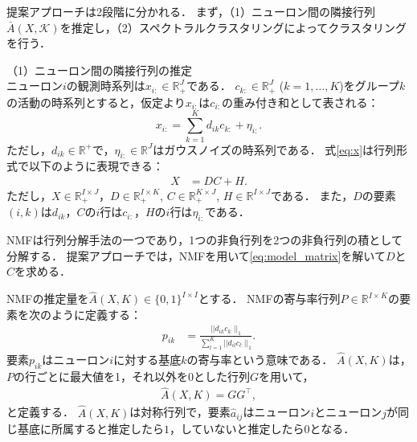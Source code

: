 \documentclass[
  11pt, %
  twocolumn, %
  headings=small, %
]{scrartcl} \usepackage[
\begin{document}
提案アプローチは2段階に分かれる．
まず，（1）ニューロン間の隣接行列$\bar{A}(X,\mathcal{K})$を推定し，（2）スペクトラルクラスタリングによってクラスタリングを行う．

\noindent（1）ニューロン間の隣接行列の推定\\
ニューロン$i$の観測時系列は$x_{i:} \in \mathbb{R}_+^{J}$である．
$c_{k:} \in \mathbb{R}^J_+$ ($k=1,\dots,K$)をグループ$k$の活動の時系列とすると，仮定より$x_{i:}$は$c_{i:}$の重み付き和として表される：
\begin{equation}
	x_{i:} = \sum_{k=1}^K d_{ik} c_{k:} + \eta_{i:}.
  \label{eq:x}
\end{equation}
ただし，$d_{ik} \in \mathbb{R}^+$で，$\eta_{i:} \in \mathbb{R}^J$はガウスノイズの時系列である．
式\eqref{eq:x}は行列形式で以下のように表現できる：
\begin{align}
  X &= DC + H.
  \label{eq:model_matrix}
\end{align}
ただし，$X \in \mathbb{R}_+^{I \times J}$，$D \in \mathbb{R}_+^{I \times K}$, $C \in \mathbb{R}_+^{K \times J}$, $H \in \mathbb{R}^{I \times J}$である．
また，$D$の要素$(i,k)$は$d_{ik}$，$C$の$i$行は$c_{i:}$，$H$の$i$行は$\eta_{i:}$である．

NMFは行列分解手法の一つであり，1つの非負行列を2つの非負行列の積として分解する．
提案アプローチでは，NMFを用いて\eqref{eq:model_matrix}を解いて$D$と$C$を求める．

NMFの推定量を$\hat{A}(X, K)\in \{0,1\}^{I \times I}$とする．
NMFの寄与率行列$P \in \mathbb{R}^{I \times K}$の要素を次のように定義する：
\begin{align}
	p_{ik} &= \frac{||d_{ik} c_{k:}||_1}{\sum_{l=1}^K || d_{il} c_{l:} ||_1}.
\end{align}
要素$p_{ik}$はニューロン$i$に対する基底$k$の寄与率という意味である．
$\hat{A}(X, K)$は，$P$の行ごとに最大値を1，それ以外を0とした行列$G$を用いて，
\begin{align}
	\hat{A}(X,K) = G G^{\top},
\end{align}
と定義する．
$\hat{A}(X,K)$は対称行列で，要素$\hat{a}_{ij}$はニューロン$i$とニューロン$j$が同じ基底に所属すると推定したら$1$，していないと推定したら$0$となる．
\end{document}
